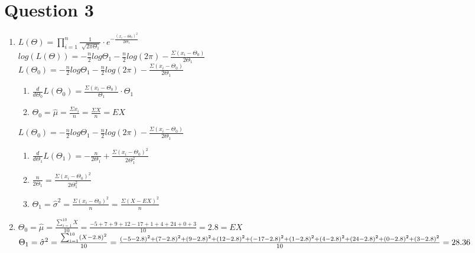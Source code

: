 \documentclass{article}
\begin{document}
\section*{Question 3}
\begin{enumerate}
    \item $L(\Theta)=\prod_{i=1}^{n} \frac{1}{\sqrt[]{2\pi\Theta_1}}\cdot e^{-\frac{(x_i-\Theta_0)^2}{2\Theta_1}}$ 
    \\$log(L(\Theta)) = -\frac{n}{2}log\Theta_1 -\frac{n}{2}log(2\pi)-\frac{\Sigma(x_i - \Theta_0)}{2\Theta_1}$
    \\$L(\Theta_0) = -\frac{n}{2}log\Theta_1 -\frac{n}{2}log(2\pi)-\frac{\Sigma(x_i - \Theta_0)}{2\Theta_1} $ 
    \begin{enumerate}[label=\Roman*]
        \item $\frac{d}{d\Theta_0} L(\Theta_0) = \frac{\Sigma (x_i - \Theta_0)}{\Theta_1} \cdot \Theta_1$
        \item $\Theta_0 = \hat{\mu} = \frac{\Sigma x_i}{n} = \frac{\Sigma X}{n} = EX$
    \end{enumerate}
    $L(\Theta_0) = -\frac{n}{2}log\Theta_1 -\frac{n}{2}log(2\pi)-\frac{\Sigma(x_i - \Theta_0)}{2\Theta_1} $ 
    \begin{enumerate}[label=\Roman*]
        \item $\frac{d}{d\Theta_1} L(\Theta_1) = -\frac{n}{2\Theta_1} + \frac{\Sigma(x_i - \Theta_0)^2}{2\Theta_1^2}$
        \item $\frac{n}{2\Theta_1} = \frac{\Sigma(x_i - \Theta_0)^2}{2\Theta_1^2}$
        \item $\Theta_1= \hat{\sigma}^2 = \frac{\Sigma(x_i - \Theta_0)^2}{n} =  \frac{\Sigma(X - EX)^2}{n}$
    \end{enumerate}
    \item $\Theta_0 = \hat{\mu} = \frac{\sum_{i=1}^{10} X}{10} = \frac{-5 + 7 + 9 + 12 - 17 + 1 + 4 + 24 + 0 + 3}{10} = 2.8=  EX$
    \\ $\Theta_1= \hat{\sigma}^2 = \frac{\sum_{i=1}^{10}(X - 2.8)^2}{10} = \\\frac{(-5 - 2.8)^2 + (7 - 2.8)^2 + (9 - 2.8)^2 + (12 - 2.8)^2 + (-17 - 2.8)^2 + (1 - 2.8)^2 + (4 - 2.8)^2 + (24 - 2.8)^2 + (0 - 2.8)^2 + (3 - 2.8)^2}{10}\\= 28.36$
\end{enumerate}
\end{document}
